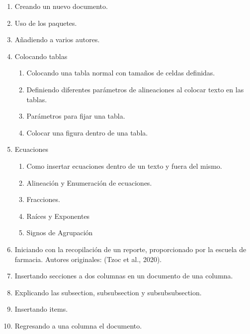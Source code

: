 \documentclass[12pt,letterpaper]{article}
\begin{document}
\begin{enumerate}
    \item Creando un nuevo documento.
    \item Uso de los paquetes.
    \item Añadiendo a varios autores.
    \item Colocando tablas
        \begin{enumerate}
            \item Colocando una tabla normal con tamaños de celdas definidas.
            
            \item Definiendo diferentes parámetros de alineaciones al colocar texto en las tablas.
            
            \item Parámetros para fijar una tabla.
            
            \item Colocar una figura dentro de una tabla.
        \end{enumerate}
    \item Ecuaciones
        \begin{enumerate}
            \item Como insertar ecuaciones dentro de un texto y fuera del mismo.
            \item Alineación y Enumeración de ecuaciones.
            \item Fracciones.
            \item Raíces y Exponentes
            \item Signos de Agrupación
        \end{enumerate}
    \item Iniciando con la recopilación de un reporte, proporcionado por la escuela de farmacia. Autores originales: (Tzoc et al., 2020).
    
    \item Insertando secciones a dos columnas en un documento de una columna.
    
    \item Explicando las subsection, subsubsection y subsubsubsection.
    
    \item Insertando items.
    \item Regresando a una columna el documento.
    

\end{enumerate}
\end{document}
